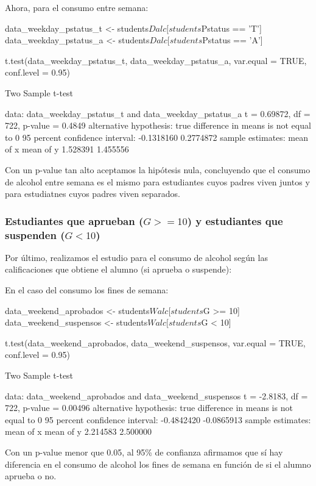 \documentclass[12pt,a4paper]{article}
\begin{document}
Ahora, para el consumo entre semana:
\begin{spverbatim}
data_weekday_pstatus_t <- students$Dalc[students$Pstatus == 'T'] 
data_weekday_pstatus_a <- students$Dalc[students$Pstatus == 'A'] 

t.test(data_weekday_pstatus_t, data_weekday_pstatus_a, var.equal = TRUE, conf.level = 0.95)

Two Sample t-test

data:  data_weekday_pstatus_t and data_weekday_pstatus_a
t = 0.69872, df = 722, p-value = 0.4849
alternative hypothesis: true difference in means is not equal to 0
95 percent confidence interval:
 -0.1318160  0.2774872
sample estimates:
mean of x mean of y 
 1.528391  1.455556

\end{spverbatim}
Con un p-value tan alto aceptamos la hipótesis nula, concluyendo que el consumo de alcohol entre semana es el mismo para estudiantes cuyos padres viven juntos y para estudiatnes cuyos padres viven separados.


\subsubsection{Estudiantes que aprueban ($G >= 10$) y estudiantes que suspenden ($G < 10$)}
  
Por último, realizamos el estudio para el consumo de alcohol según las calificaciones que obtiene el alumno (si aprueba o suspende):

En el caso del consumo los fines de semana:
\begin{spverbatim}
data_weekend_aprobados <- students$Walc[students$G >= 10] 
data_weekend_suspensos <- students$Walc[students$G < 10] 

t.test(data_weekend_aprobados, data_weekend_suspensos, var.equal = TRUE, conf.level = 0.95)

Two Sample t-test

data:  data_weekend_aprobados and data_weekend_suspensos
t = -2.8183, df = 722, p-value = 0.00496
alternative hypothesis: true difference in means is not equal to 0
95 percent confidence interval:
 -0.4842420 -0.0865913
sample estimates:
mean of x mean of y 
 2.214583  2.500000
 
\end{spverbatim}
Con un p-value menor que 0.05, al 95\% de confianza afirmamos que sí hay diferencia en el consumo de alcohol los fines de semana en función de si el alumno aprueba o no.
\end{document}
